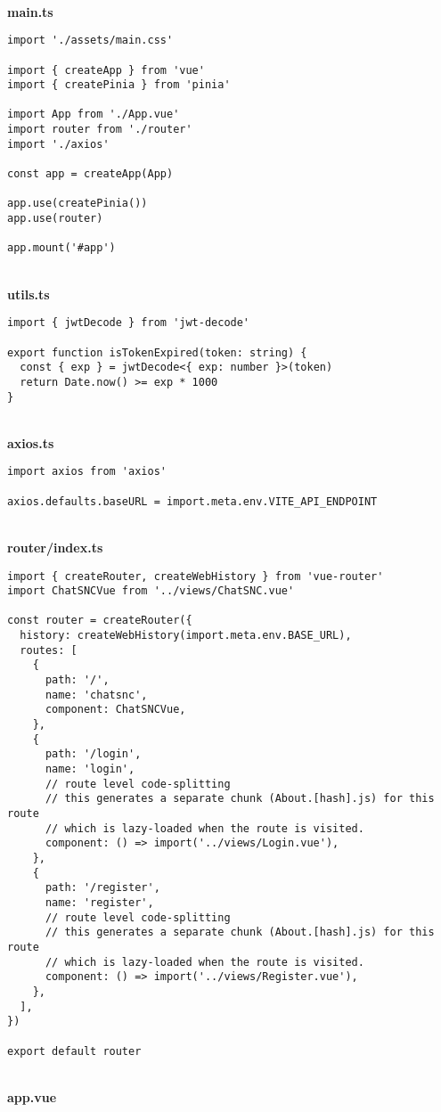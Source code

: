 \
\\
\textbf{main.ts}

\begin{Verbatim}[breaklines=true, breakanywhere=true]
import './assets/main.css'

import { createApp } from 'vue'
import { createPinia } from 'pinia'

import App from './App.vue'
import router from './router'
import './axios'

const app = createApp(App)

app.use(createPinia())
app.use(router)

app.mount('#app')

\end{Verbatim}

\
\\
\textbf{utils.ts}

\begin{Verbatim}[breaklines=true, breakanywhere=true]
import { jwtDecode } from 'jwt-decode'

export function isTokenExpired(token: string) {
  const { exp } = jwtDecode<{ exp: number }>(token)
  return Date.now() >= exp * 1000
}  
\end{Verbatim}

\
\\
\textbf{axios.ts}

\begin{Verbatim}[breaklines=true, breakanywhere=true]
import axios from 'axios'

axios.defaults.baseURL = import.meta.env.VITE_API_ENDPOINT
\end{Verbatim}

\
\\
\textbf{router/index.ts}

\begin{Verbatim}[breaklines=true, breakanywhere=true]
import { createRouter, createWebHistory } from 'vue-router'
import ChatSNCVue from '../views/ChatSNC.vue'

const router = createRouter({
  history: createWebHistory(import.meta.env.BASE_URL),
  routes: [
    {
      path: '/',
      name: 'chatsnc',
      component: ChatSNCVue,
    },
    {
      path: '/login',
      name: 'login',
      // route level code-splitting
      // this generates a separate chunk (About.[hash].js) for this route
      // which is lazy-loaded when the route is visited.
      component: () => import('../views/Login.vue'),
    },
    {
      path: '/register',
      name: 'register',
      // route level code-splitting
      // this generates a separate chunk (About.[hash].js) for this route
      // which is lazy-loaded when the route is visited.
      component: () => import('../views/Register.vue'),
    },
  ],
})

export default router
\end{Verbatim}
\
\\
\textbf{app.vue}

